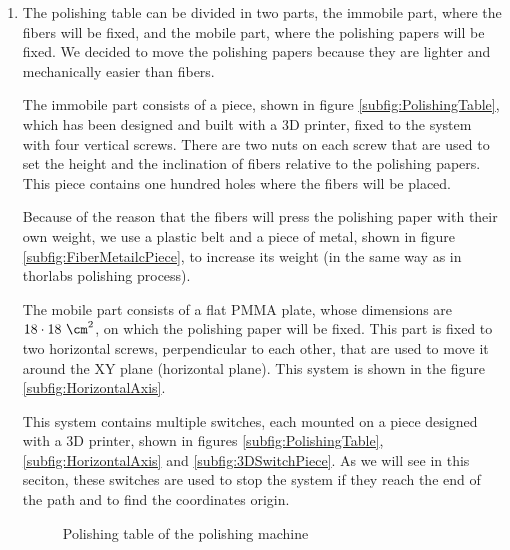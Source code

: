 \begin{enumerate}
\item{} The polishing table can be divided in two parts, the immobile part, where the fibers will be fixed, and the mobile part, where the polishing papers will be fixed. We decided to move the polishing papers because they are lighter and mechanically easier than fibers.

The immobile part consists of a piece, shown in figure \ref{subfig:PolishingTable}, which has been designed and built with a 3D printer, fixed to the system with four vertical screws. There are two nuts on each screw that are used to set the height and the inclination of fibers relative to the polishing papers. This piece contains one hundred holes where the fibers will be placed. 

Because of the reason that the fibers will press the polishing paper with their own weight, we use a plastic belt and a piece of metal, shown in figure \ref{subfig:FiberMetailcPiece}, to increase its weight (in the same way as in thorlabs polishing process).

The mobile part consists of a flat PMMA plate, whose dimensions are $18 \cdot{} 18~\cm^2$, on which the polishing paper will be fixed. This part is fixed to two horizontal screws, perpendicular to each other, that are used to move it around the XY plane (horizontal plane). This system is shown in the figure \ref{subfig:HorizontalAxis}.

This system contains multiple switches, each mounted on a piece designed with a 3D printer, shown in figures \ref{subfig:PolishingTable}, \ref{subfig:HorizontalAxis} and \ref{subfig:3DSwitchPiece}. As we will see in this seciton, these switches are used to stop the system if they reach the end of the path and to find the coordinates origin.

\begin{figure}[htbp]
 \centering
    \newline
 \caption{Polishing table of the polishing machine}
 \label{fig:PolishingTable}
\end{figure}


\end{enumerate}
